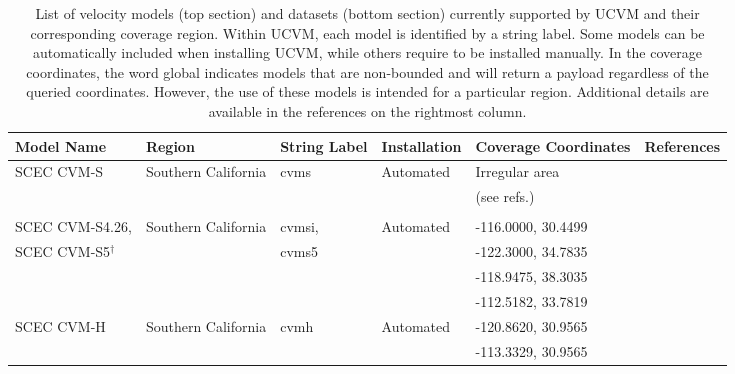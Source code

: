 
\makeatletter
\if@twocolumn
      \def\cvmtablefont{\small}
      \def\cvmtablefoot{\footnotesize}
\else
      \def\cvmtablefont{\scriptsize}
      \def\cvmtablefoot{\tiny}
\fi
\makeatother

\begin{table*}%
\centering
\cvmtablefont
\caption{List of velocity models (top section) and datasets (bottom section) currently supported by UCVM and their corresponding coverage region. Within UCVM, each model is identified by a string label. Some models can be automatically included when installing UCVM, while others require to be installed manually. In the coverage coordinates, the word global indicates models that are non-bounded and will return a payload regardless of the queried coordinates. However, the use of these models is intended for a particular region. Additional details are available in the references on the rightmost column.}
\begin{tabular}[]{llllll}
Model Name         & Region                & String Label & Installation & Coverage Coordinates & References \\
\hline
SCEC CVM-S         & Southern California   & cvms          &  Automated   & Irregular area     & \citet{Magistrale_1996_BSSA} \\
                   &                       &               &              & (see refs.)        & \citet{Magistrale_2000_BSSA} \\
                   &                       &               &              &                    & \citet{Kohler_2003_BSSA}     \\
SCEC CVM-S4.26,    & Southern California   & cvmsi,        &  Automated   & -116.0000, 30.4499 & \citet{Chen_2011_Proc}       \\
SCEC CVM-S5$^\dagger$&                     & cvms5         &              & -122.3000, 34.7835 & \citet{Lee_2014_JGR}         \\
                   &                       &               &              & -118.9475, 38.3035 & \citet{Lee_2014_SRL}         \\
                   &                       &               &              & -112.5182, 33.7819 &                              \\
SCEC CVM-H         & Southern California   & cvmh          &  Automated   & -120.8620, 30.9565 & \citet{Suss_2003_JGR}        \\
                   &                       &               &              & -113.3329, 30.9565 & \citet{Plesch_2011_SCEC}     \\

\end{tabular}
\end{table*}
